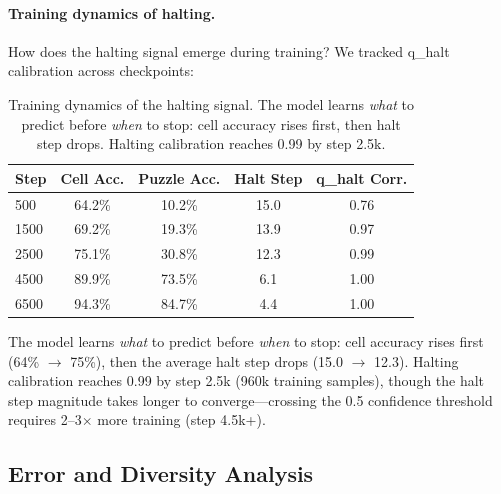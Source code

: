 \paragraph{Training dynamics of halting.}
How does the halting signal emerge during training? We tracked q\_halt
calibration across checkpoints:
%
\begin{table}[h]
\centering
\begin{tabular}{lcccc}
\toprule
Step & Cell Acc. & Puzzle Acc. & Halt Step & q\_halt Corr. \\
\midrule
500 & 64.2\% & 10.2\% & 15.0 & 0.76 \\  %
1500 & 69.2\% & 19.3\% & 13.9 & 0.97 \\  %
2500 & 75.1\% & 30.8\% & 12.3 & 0.99 \\  %
4500 & 89.9\% & 73.5\% & 6.1 & 1.00 \\  %
6500 & 94.3\% & 84.7\% & 4.4 & 1.00 \\  %
\bottomrule
\end{tabular}
\caption{Training dynamics of the halting signal. The model learns \emph{what}
to predict before \emph{when} to stop: cell accuracy rises first, then halt
step drops. Halting calibration reaches 0.99 by step 2.5k.}
\label{tab:halt-training}
\end{table}
%
The model learns \emph{what} to predict before \emph{when} to stop: cell
accuracy rises first (64\% $\to$ 75\%), then the average halt step drops
(15.0 $\to$ 12.3). Halting calibration reaches 0.99 by step 2.5k (960k
training samples), though the halt step magnitude takes longer to
converge---crossing the 0.5 confidence threshold requires 2--3$\times$ more
training (step 4.5k+).

\subsection{Error and Diversity Analysis}


